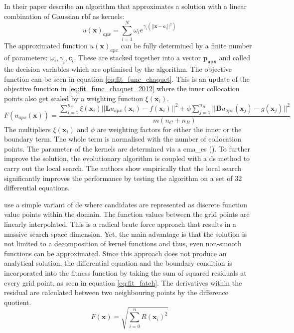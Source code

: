 \documentclass[./\jobname.tex]{subfiles}
\begin{document}
In their paper \cite{chaquet_using_2019} describe an algorithm that approximates a solution with a linear combination of Gaussian \gls{rbf} as kernels:
\begin{equation}
u(\mathbf{x})_{apx} = \sum_{i=1}^{N} \omega_i e^{\gamma_i (\left||\mathbf{x} - \mathbf{c}_i\right||^2)}
\end{equation}
The approximated function $u(\mathbf{x})_{apx}$ can be fully determined by a finite number of parameters: $\omega_i, \gamma_i, \mathbf{c}_i$. These are stacked together into a vector $\mathbf{p_{apx}}$ and called the decision variables which are optimised by the algorithm. 
The objective function can be seen in equation \eqref{eq:fit_func_chaquet}. This is an update of the objective function in \ref{eq:fit_func_chaquet_2012} where the inner collocation points also get scaled by a weighting function $\xi(\mathbf{x}_i)$.
\begin{equation}
\label{eq:fit_func_chaquet}
F(u_{apx}(\mathbf{x})) = \frac{\sum_{i=1}^{n_C} \xi (\mathbf{x}_i) || \mathbf{L}u_{apx}(\mathbf{x}_i) - f(\mathbf{x}_i)||^2 + \phi \sum_{j=1}^{n_B} || \mathbf{B}u_{apx}(\mathbf{x}_j) - g(\mathbf{x}_j)||^2}{m (n_C + n_B)}  
\end{equation}
The multipliers $\xi(\mathbf{x}_i)$ and $\phi$ are weighting factors for either the inner or the boundary term. The whole term is normalised with the number of collocation points. 
The parameter of the kernels are determined via a \gls{cma_es} (\cite{hansen_reducing_2003}). To further improve the solution, the evolutionary algorithm is coupled with a \gls{ds} method to carry out the local search. The authors show empirically that the local search significantly improves the performance by testing the algorithm on a set of 32 differential equations. 

\cite{fateh_differential_2019} use a simple variant of \gls{de} where candidates are represented as discrete function value points within the domain. The function values between the grid points are linearly interpolated. This is a radical brute force approach that results in a massive search space dimension. Yet, the main advantage is that the solution is not limited to a decomposition of kernel functions and thus, even non-smooth functions can be approximated. Since this approach does not produce an analytical solution, the differential equation and the boundary condition is incorporated into the fitness function by taking the sum of squared residuals at every grid point, as seen in equation \eqref{eq:fit_fateh}. The derivatives within the residual are calculated between two neighbouring points by the difference quotient. 
\begin{equation}
\label{eq:fit_fateh}
F(\mathbf{x}) = \sqrt{\sum_{i=0}^{n} R(\mathbf{x}_i)^2}
\end{equation}
\end{document}
